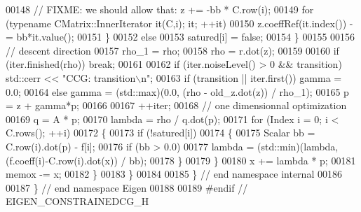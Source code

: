 \begin{DoxyCode}
00148           \textcolor{comment}{// FIXME: we should allow that: z += -bb * C.row(i);}
00149           \textcolor{keywordflow}{for} (\textcolor{keyword}{typename} CMatrix::InnerIterator it(C,i); it; ++it)
00150             z.coeffRef(it.index()) -= bb*it.value();
00151       \}
00152       \textcolor{keywordflow}{else}
00153         satured[i] = \textcolor{keyword}{false};
00154     \}
00155 
00156     \textcolor{comment}{// descent direction}
00157     rho\_1 = rho;
00158     rho = r.dot(z);
00159 
00160     \textcolor{keywordflow}{if} (iter.finished(rho)) \textcolor{keywordflow}{break};
00161 
00162     \textcolor{keywordflow}{if} (iter.noiseLevel() > 0 && transition) std::cerr << \textcolor{stringliteral}{"CCG: transition\(\backslash\)n"};
00163     \textcolor{keywordflow}{if} (transition || iter.first()) gamma = 0.0;
00164     \textcolor{keywordflow}{else} gamma = (std::max)(0.0, (rho - old\_z.dot(z)) / rho\_1);
00165     p = z + gamma*p;
00166 
00167     ++iter;
00168     \textcolor{comment}{// one dimensionnal optimization}
00169     q = A * p;
00170     lambda = rho / q.dot(p);
00171     \textcolor{keywordflow}{for} (Index i = 0; i < C.rows(); ++i)
00172     \{
00173       \textcolor{keywordflow}{if} (!satured[i])
00174       \{
00175         Scalar bb = C.row(i).dot(p) - f[i];
00176         \textcolor{keywordflow}{if} (bb > 0.0)
00177           lambda = (std::min)(lambda, (f.coeff(i)-C.row(i).dot(x)) / bb);
00178       \}
00179     \}
00180     x += lambda * p;
00181     memox -= x;
00182   \}
00183 \}
00184 
00185 \} \textcolor{comment}{// end namespace internal}
00186 
00187 \} \textcolor{comment}{// end namespace Eigen}
00188 
00189 \textcolor{preprocessor}{#endif // EIGEN\_CONSTRAINEDCG\_H}
\end{DoxyCode}
